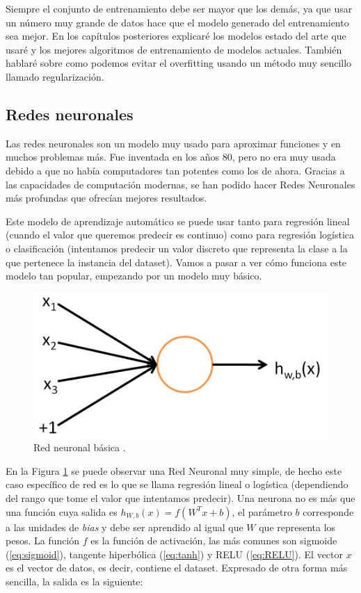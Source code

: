 Siempre el conjunto de entrenamiento debe ser mayor que los demás, ya que usar un número muy grande de datos hace que el modelo generado del entrenamiento sea mejor. En los capítulos posteriores explicaré los modelos estado del arte que usaré y los mejores algoritmos de entrenamiento de modelos actuales. También hablaré sobre como podemos evitar el overfitting usando un método muy sencillo llamado regularización.

\subsection{Redes neuronales}

Las redes neuronales son un modelo muy usado para aproximar funciones y en muchos problemas más. Fue inventada en los años 80, pero no era muy usada debido a que no había computadores tan potentes como los de ahora. Gracias a las capacidades de computación modernas, se han podido hacer Redes Neuronales más profundas que ofrecían mejores resultados.\newline

Este modelo de aprendizaje automático se puede usar tanto para regresión lineal (cuando el valor que queremos predecir es continuo) como para regresión logística o clasificación (intentamos predecir un valor discreto que representa la clase a la que pertenece la instancia del dataset). Vamos a pasar a ver cómo funciona este modelo tan popular, empezando por un modelo muy básico.

\begin{figure}[H]
	\includegraphics[scale=0.25]{imagenes/03_Estado_del_arte/simplenn.png}
	\centering
	\caption{Red neuronal básica \cite{ng}.}
	\label{fig:simlestnn}
\end{figure}

En la Figura \ref{fig:simlestnn} se puede observar una Red Neuronal muy simple, de hecho este caso específico de red es lo que se llama regresión lineal o logística (dependiendo del rango que tome el valor que intentamos predecir). Una neurona no es más que una función cuya salida es $h_{W,b}(x)=f(W^Tx+b)$, el parámetro $b$ corresponde a las unidades de \textit{bias} y debe ser aprendido al igual que $W$ que representa los pesos. La función $f$ es la función de activación, las más comunes son sigmoide (\ref{eq:sigmoid}), tangente hiperbólica (\ref{eq:tanh}) y RELU (\ref{eq:RELU}). El vector $x$ es el vector de datos, es decir, contiene el dataset. Expresado de otra forma más sencilla, la salida es la siguiente:\newline

